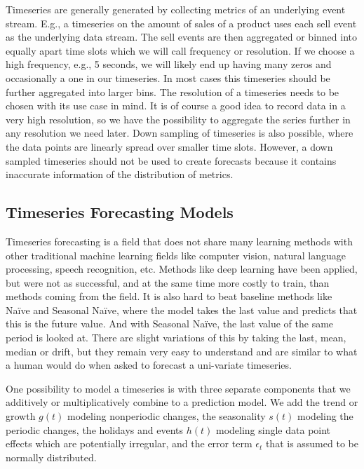 Timeseries are generally generated by collecting metrics of an underlying event stream. E.g., a timeseries on the amount of sales of a product uses each sell event as the underlying data stream. The sell events are then aggregated or binned into equally apart time slots which we will call frequency or resolution. If we choose a high frequency, e.g., 5 seconds, we will likely end up having many zeros and occasionally a one in our timeseries. In most cases this timeseries should be further aggregated into larger bins. The resolution of a timeseries needs to be chosen with its use case in mind. It is of course a good idea to record data in a very high resolution, so we have the possibility to aggregate the series further in any resolution we need later. Down sampling of timeseries is also possible, where the data points are linearly spread over smaller time slots. However, a down sampled timeseries should not be used to create forecasts because it contains inaccurate information of the distribution of metrics.


\subsection{Timeseries Forecasting Models}

Timeseries forecasting is a field that does not share many learning methods with other traditional machine learning fields like computer vision, natural language processing, speech recognition, etc. Methods like deep learning have been applied, but were not as successful, and at the same time more costly to train, than methods coming from the field. It is also hard to beat baseline methods like Na\"ive and Seasonal Na\"ive, where the model takes the last value and predicts that this is the future value. And with Seasonal Na\"ive, the last value of the same period is looked at. There are slight variations of this by taking the last, mean, median or drift, but they remain very easy to understand and are similar to what a human would do when asked to forecast a uni-variate timeseries.

One possibility to model a timeseries is with three separate components that we additively or multiplicatively combine to a prediction model. We add the trend or growth \(g(t)\) modeling nonperiodic changes, the seasonality \(s(t)\) modeling the periodic changes, the holidays and events \(h(t)\) modeling single data point effects which are potentially irregular, and the error term \(\epsilon_t\) that is assumed to be normally distributed.

